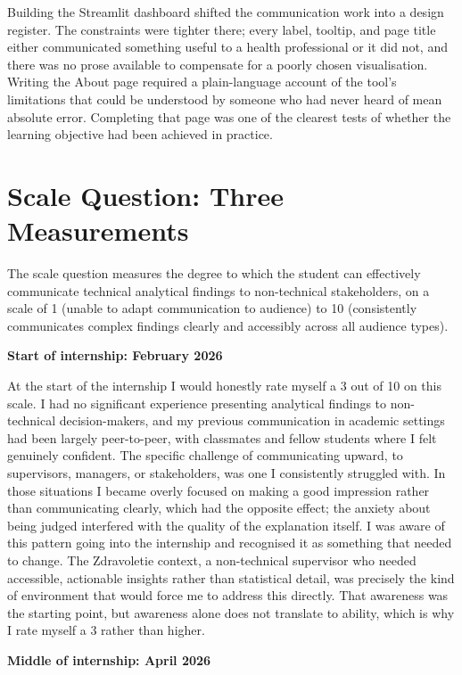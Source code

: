 \documentclass[11pt,a4paper]{report}
\begin{document}
Building the Streamlit dashboard shifted the communication work into a design register. The
constraints were tighter there; every label, tooltip, and page title either communicated something
useful to a health professional or it did not, and there was no prose available to compensate for a
poorly chosen visualisation. Writing the About page required a plain-language account of the tool's
limitations that could be understood by someone who had never heard of mean absolute error.
Completing that page was one of the clearest tests of whether the learning objective had been
achieved in practice.

\section{Scale Question: Three Measurements}

The scale question measures the degree to which the student can effectively communicate technical
analytical findings to non-technical stakeholders, on a scale of 1 (unable to adapt communication
to audience) to 10 (consistently communicates complex findings clearly and accessibly across all
audience types).

\textbf{Start of internship: February 2026}

At the start of the internship I would honestly rate myself a 3 out of 10 on this scale. I had no
significant experience presenting analytical findings to non-technical decision-makers, and my
previous communication in academic settings had been largely peer-to-peer, with classmates and
fellow students where I felt genuinely confident. The specific challenge of communicating upward,
to supervisors, managers, or stakeholders, was one I consistently struggled with. In those
situations I became overly focused on making a good impression rather than communicating clearly,
which had the opposite effect; the anxiety about being judged interfered with the quality of the
explanation itself. I was aware of this pattern going into the internship and recognised it as
something that needed to change. The Zdravoletie context, a non-technical supervisor who needed
accessible, actionable insights rather than statistical detail, was precisely the kind of
environment that would force me to address this directly. That awareness was the starting point,
but awareness alone does not translate to ability, which is why I rate myself a 3 rather than
higher.

\textbf{Middle of internship: April 2026}
\end{document}
